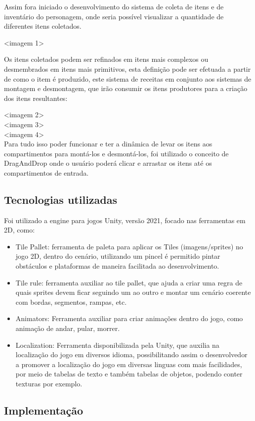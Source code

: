 Assim fora iniciado o desenvolvimento do sistema de coleta de itens e de inventário do personagem, onde seria possível visualizar a quantidade de diferentes itens coletados. 

<imagem 1>

Os itens coletados podem ser refinados em itens mais complexos ou desmembrados em itens mais primitivos, esta definição pode ser efetuada a partir de como o item é produzido, este sistema de receitas em conjunto aos sistemas de montagem e desmontagem, que irão consumir os itens produtores para a criação dos itens resultantes:

<imagem 2>\\
<imagem 3>\\
<imagem 4>\\

Para tudo isso poder funcionar e ter a dinâmica de levar os itens aos compartimentos para montá-los e desmontá-los, foi utilizado o conceito de DragAndDrop onde o usuário poderá clicar e arrastar os itens até os compartimentos de entrada.

\subsection{Tecnologias utilizadas}
Foi utilizado a engine para jogos Unity, versão 2021, focado nas ferramentas em 2D, como:
\begin{itemize}
    \item Tile Pallet: ferramenta de paleta para aplicar os Tiles (imagens/sprites) no jogo 2D, dentro do cenário, utilizando um pincel é permitido pintar obstáculos e plataformas de maneira facilitada ao desenvolvimento.
    \item Tile rule: ferramenta auxiliar ao tile pallet, que ajuda a criar uma regra de quais sprites devem ficar seguindo um ao outro e montar um cenário coerente com bordas, segmentos, rampas, etc.
    \item Animators: Ferramenta auxiliar para criar animações dentro do jogo, como animação de andar, pular, morrer.
    \item Localization: Ferramenta disponibilizada pela Unity, que auxilia na localização do jogo em diversos idioma, possibilitando assim o desenvolvedor a promover a localização do jogo em diversas linguas com mais facilidades, por meio de tabelas de texto e também tabelas de objetos, podendo conter texturas por exemplo.
\end{itemize}

\subsection{Implementação}
\lipsum[34-48]




